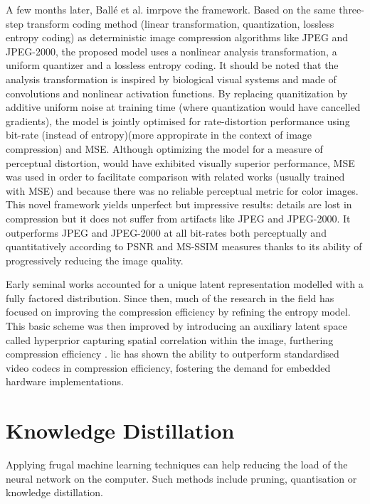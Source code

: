 A few months later, Ballé et al. \cite{ballé2017endtoendoptimizedimagecompression} imrpove the framework. Based on the same three-step transform coding method (linear transformation, quantization, lossless entropy coding) as deterministic image compression algorithms like JPEG and JPEG-2000, the proposed model uses a nonlinear analysis transformation, a uniform quantizer and a lossless entropy coding. It should be noted that the analysis transformation is inspired by biological visual systems and made of convolutions and nonlinear activation functions. By replacing quanitization by additive uniform noise at training time (where quantization would have cancelled gradients), the model is jointly optimised for rate-distortion performance using bit-rate (instead of entropy)(more appropirate in the context of image compression) and MSE. Although optimizing the model for a measure of perceptual distortion, would have exhibited visually superior performance, MSE was used in order to facilitate comparison with related works (usually trained with MSE) and because there was no reliable perceptual metric for color images. This novel framework yields unperfect but impressive results: details are lost in compression but it does not suffer from artifacts like JPEG and JPEG-2000. It outperforms JPEG and JPEG-2000 at all bit-rates both perceptually and quantitatively according to PSNR and MS-SSIM measures thanks to its ability of progressively reducing the image quality.

Early seminal works accounted for a unique latent representation modelled with a fully factored distribution. Since then, much of the research in the field has focused on improving the compression efficiency by refining the entropy model. This basic scheme was then improved by introducing an auxiliary latent space called hyperprior capturing spatial correlation within the image, furthering compression efficiency \cite{ballé2018variationalimagecompressionscale}. \acrshort{lic} has shown the ability to outperform standardised video codecs in compression efficiency, fostering the demand for embedded hardware implementations.

\section{Knowledge Distillation}
Applying frugal machine learning techniques can help reducing the load of the neural network on the computer. Such methods include pruning, quantisation or knowledge distillation\cite{touvron2021trainingdataefficientimagetransformers}. %

